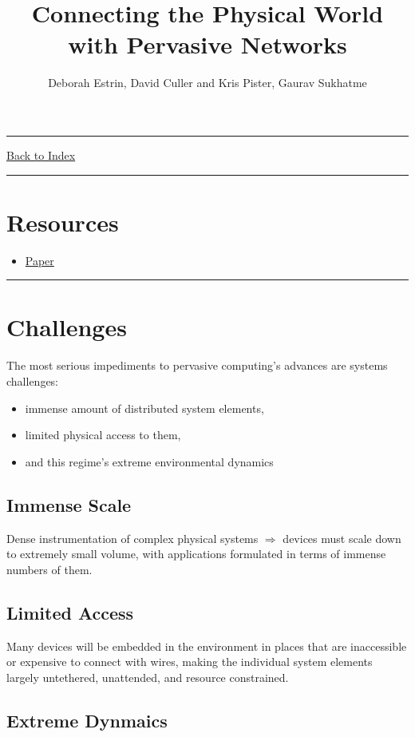\documentclass[letterpaper,10pt]{article}
\title{\textbf{Connecting the Physical World with Pervasive Networks}}
\author{Deborah Estrin, David Culler and Kris Pister, Gaurav Sukhatme}
\newcommand{\panhline}{\begin{center}\rule{\textwidth}{1pt}\end{center}}
\begin{document}
\maketitle

\panhline
\href{../index.html}{Back to Index}

\panhline
\tableofcontents

\section*{Resources}

\begin{itemize}
	\item \href{../../Readings/Connecting the Physical World with Pervasive Networks.pdf}{Paper}
\end{itemize}

\panhline

\section{Challenges}

The most serious impediments to pervasive computing's advances are systems challenges:
\begin{itemize}
	\item immense amount of distributed system elements,
	\item limited physical access to them,
	\item and this regime's extreme environmental dynamics
\end{itemize}

\subsection{Immense Scale}

Dense instrumentation of complex physical systems $\Rightarrow$ devices must scale down to extremely small volume, with applications formulated in terms of immense numbers of them.

\subsection{Limited Access}

Many devices will be embedded in the environment in places that are inaccessible or expensive to connect with wires, making the individual system elements largely untethered, unattended, and resource constrained.

\subsection{Extreme Dynmaics}
\end{document}
